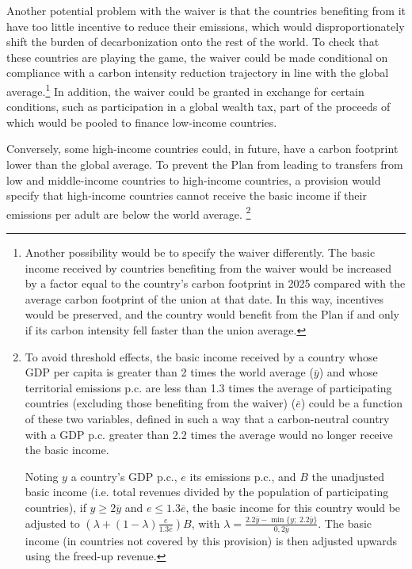 \documentclass[a5paper,english,openany]{memoir}
\begin{document}
Another potential problem with the waiver is that the countries benefiting %
from it have too little incentive to reduce their emissions, which would disproportionately shift the burden of decarbonization %
onto the rest of the world. To check that these countries are playing the game, the waiver could be made conditional on compliance with a carbon intensity reduction trajectory in line with the global average.\footnote{Another possibility would be to specify the waiver differently. The basic income received by countries benefiting %
from the waiver would be increased by a factor equal to the country's carbon footprint in 2025 compared with the average carbon footprint of the union at that date. In this way, incentives would be preserved, and the country would benefit from the Plan if and only if its carbon intensity fell faster than the union average.} %
In addition, the waiver could be granted in exchange for certain conditions, such as participation in a global wealth tax, part of the proceeds of which would be pooled to finance low-income countries.

Conversely, some high-income countries could, in future, %
have a carbon footprint lower than the global average. To prevent the Plan from leading to transfers from low %
and middle-income countries to high-income countries, a provision would specify that high-income countries cannot receive the basic income if their emissions per adult are below the world average.%
\footnote{To avoid threshold effects, the basic income received by a country whose GDP per capita is greater than 2 times the world average ($\overline{y}$) and whose territorial emissions p.c. are less than 1.3 times the average of participating countries (excluding those benefiting from the waiver) ($\overline{e}$) could be a function of these two variables, defined in such a way that a carbon-neutral country with a GDP p.c. greater than 2.2 times the average would no longer receive the basic income. 

Noting $y$ a country's GDP p.c., $e$ its emissions p.c., and $B$ the unadjusted basic income (i.e. total revenues divided by the population of participating countries), if $y\geq 2\overline{y}$ and $e \leq 1.3 \overline{e}$, the basic income for this country would be adjusted to $\left(\lambda + \left(1-\lambda \right) \frac{e}{1.3\overline{e}} \right) B$, with $\lambda = \frac{2.2\overline{y}-\min\{y;\;2.2\overline{y}\}}{0,2\overline{y}}$. 
The basic income (in countries not covered by this provision) is then adjusted upwards using the freed-up revenue.} 
\end{document}
